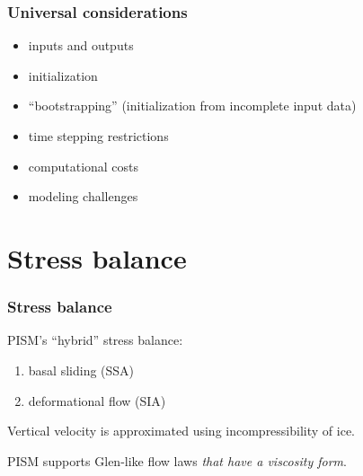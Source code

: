 \documentclass[hide notes,intlimits]{beamer}
\begin{document}
\begin{frame}
  \frametitle{Universal considerations}
  \begin{itemize}
  \item inputs and outputs
  \item initialization
  \item ``bootstrapping'' (initialization from incomplete input data)
  \item time stepping restrictions
  \item computational costs
  \item modeling challenges
  \end{itemize}
\end{frame}

\section{Stress balance}
\label{sec:stress-balance}

\begin{frame}
  \frametitle{Stress balance}

  PISM's ``hybrid'' stress balance:
  \begin{enumerate}
  \item basal sliding (SSA)
  \item deformational flow (SIA)
  \end{enumerate}

  Vertical velocity is approximated using incompressibility of ice.

  PISM supports Glen-like flow laws \emph{that have a viscosity form}.

\end{frame}
\end{document}
